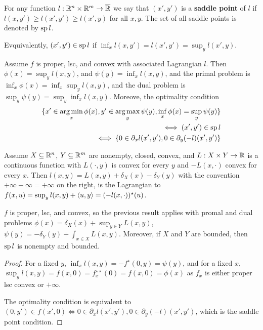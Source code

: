 \begin{defn}
  \label{sec:duality-optimization-9}
  For any function $l: \mathbb{R}^{n} \times \mathbb{R}^{m} \rightarrow \overline {\mathbb{R}}$
  we say that $(x', y')$ is a \textbf{saddle point} of $l$ if $l(x,
  y') \geq l(x', y') \geq l(x', y)$ for all $x, y$. The set of all
  saddle points is denoted by $\operatorname*{sp} l$.

  Evquivalently, $(x', y') \in \operatorname*{sp} l$ if $\inf_{x} l(x, y') = l(x',
  y') = \sup_{y} l(x', y)$.
\end{defn}

\begin{thm}
  \label{sec:duality-optimization-10}
  Assume $f$ is proper, lsc, and convex with associated Lagrangian $l$.
  Then $\phi(x) = \sup_{y} l(x, y)$, and $\psi(y) = \inf_{x} l(x, y)$,
  and the primal problem is $\inf_{x} \phi(x) = \inf_{x} \sup_{y} l(x,
  y)$, and the dual problem is $\sup_{y} \psi(y) = \sup_{y} \inf_{x}
  l(x, y)$.  Moreove, the optimality condition
  \begin{align}
    \label{eq:49}
    \{ x' \in \operatorname*{arg\,min}_{x} \phi(x), y' \in \operatorname*{arg\,max}_{y} \psi(y),
    \inf_{x} \phi(x) = \sup_{y} \psi(y) \}
    \\ \iff (x', y') \in \operatorname*{sp} l
    \\ \iff \{ 0 \in \partial_{x} l(x', y'), 0 \in \partial_{y}(-l)(x', y') \}
  \end{align}
\end{thm}

\begin{thm}
  \label{sec:duality-optimization-11}
  Assume $X \subseteq \mathbb{R}^{n}$, $Y \subseteq \mathbb{R}^{m}$ are nonempty,
  closed, convex, and $L: X \times Y \rightarrow \mathbb{R}$ is a continuous
  function with $L(\cdot, y)$ is convex for every $y$ and $-L(x,
  \cdot)$ convex for every $x$.  Then $l(x, y) = L(x, y) +
  \delta_{X}(x) - \delta_{Y}(y)$ with the convention $+\infty - \infty
  = +\infty$ on the right, is the Lagrangian to $f(x, u) = \sup_{y}
  l(x, y) + \IP{u, y} = (-l(x, \cdot))^{\star}(u)$.

  $f$ is proper, lsc, and convex, so the previous result applies with
  promal and dual problems $\phi(x) = \delta_{X}(x) + \sup_{y \in Y}
  L(x, y)$, $\psi(y) = -\delta_{Y}(y) + \int_{x \in X} L(x, y)$.
  Moreover, if $X$ and $Y$ are bounded, then $\operatorname*{sp} l$ is nonempty and bounded.
\end{thm}

\begin{proof}
  For a fixed $y$, $\inf_{x} l(x, y) = -f^{\star}(0, y) = \psi(y)$,
  and for a fixed $x$, $\sup_{y} l(x, y) = f(x, 0) = f^{\star
    \star}_{x}(0) = f(x, 0) = \phi(x)$ as $f_{x}$ is either proper lsc
  convex or $+\infty$.

  The optimality condition is equivalent to $(0, y') \in f(x', 0) \iff
  0 \in \partial_{x} l(x', y'), 0 \in \partial_{y}(-l)(x', y')$, which
  is the saddle point condition.
\end{proof}

